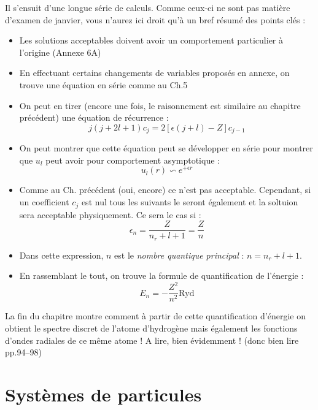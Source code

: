 \documentclass	[11pt, a4paper, openany]{book}
\begin{document}
	Il s'ensuit d'une longue série de calculs. Comme ceux-ci ne sont pas matière d'examen de janvier, vous n'aurez ici droit qu'à un bref résumé des points clés :
	\begin{itemize}
		\item Les solutions acceptables doivent avoir un comportement particulier à l’origine (Annexe 6A)
		\item En effectuant certains changements de variables proposés en annexe, on trouve une équation en série comme au Ch.5
		\item On peut en tirer (encore une fois, le raisonnement est similaire au chapitre précédent) une équation de récurrence :
		      \begin{equation}
		      	j(j+2l+1)c_j = 2[\epsilon(j+l) - Z]c_{j-1}
		      \end{equation}
		\item On peut montrer que cette équation peut se développer en série pour montrer que $u_l$ peut avoir pour comportement asymptotique : 
		      \begin{equation}
		      	u_l(r) \backsim e^{+\epsilon r}
		      \end{equation}
		\item Comme au Ch. précédent (oui, encore) ce n'est pas acceptable. Cependant, si un coefficient $c_j$ est nul tous les suivants le seront également et la soltuion sera acceptable physiquement. Ce sera le cas si :
		      \begin{equation}
		      	\epsilon_n = \frac{Z}{n_r + l + 1} = \frac{Z}{n}
		      \end{equation}
		\item Dans cette expression, $n$ est le \textit{nombre quantique principal} : $n = n_r + l + 1$.
		\item En rassemblant le tout, on trouve la formule de quantification de l'énergie :
		      \begin{equation}
		      	E_n = -\frac{Z^2}{n^2} \text{Ryd}
		      \end{equation}
	\end{itemize}
	La fin du chapitre montre comment à partir de cette quantification d'énergie on obtient le spectre discret de l'atome d'hydrogène mais également les fonctions d'ondes radiales de ce même atome ! A lire, bien évidemment ! (donc bien lire pp.94--98)
	
	
	
	\chapter{Systèmes de particules}
\end{document}
